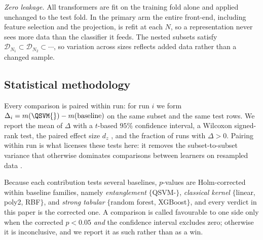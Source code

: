 \begin{revbody}
\emph{Zero leakage.} All transformers are fit on the training fold alone and
applied unchanged to the test fold. In the primary arm the entire front-end,
including feature selection and the projection, is refit at each $N$, so a
representation never sees more data than the classifier it feeds. The nested
subsets satisfy $\mathcal{D}_{N_1}\subset\mathcal{D}_{N_2}\subset\cdots$, so
variation across sizes reflects added data rather than a changed sample.
\end{revbody}

\subsection{Statistical methodology}
\begin{revbody}

Every comparison is paired within run: for run $i$ we form
$\Delta_i = m(\text{\QSVM{}}) - m(\text{baseline})$ on the same subset and the
same test rows. We report the mean of $\Delta$ with a $t$-based $95\%$
confidence interval, a Wilcoxon signed-rank test, the paired effect size $d_z$
\cite{ref32}, and the fraction of runs with $\Delta>0$. Pairing within run is
what licenses these tests here: it removes the subset-to-subset variance that
otherwise dominates comparisons between learners on resampled data \cite{ref31}.

Because each contribution tests several baselines, $p$-values are Holm-corrected
within baseline families, namely \emph{entanglement} $\{$QSVM-\Zmap{}$\}$,
\emph{classical kernel} $\{$linear, poly2, RBF$\}$, and \emph{strong tabular}
$\{$random forest, XGBoost$\}$, and every verdict in this paper is the
corrected one. A comparison is called favourable to one side only when the
corrected $p<0.05$ \emph{and} the confidence interval excludes zero; otherwise
it is inconclusive, and we report it as such rather than as a win.
\end{revbody}

